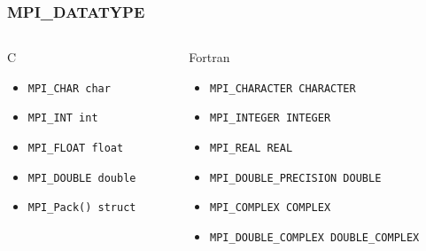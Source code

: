 \documentclass[handout]{beamer}
\begin{document}
\begin{frame}[fragile]
 \frametitle{MPI\_DATATYPE}
  \begin{columns}[T]
   \begin{column}{5cm}
    \begin{block}{C}
     \begin{itemize}
      \item \texttt{MPI\_CHAR char}
      \item \texttt{MPI\_INT int}
      \item \texttt{MPI\_FLOAT float}
      \item \texttt{MPI\_DOUBLE double}
      \item \texttt{MPI\_Pack() struct}
     \end{itemize}
    \end{block}
   \end{column}
   \begin{column}{5cm}
    \begin{block}{Fortran}
     \begin{itemize}
      \item \texttt{MPI\_CHARACTER CHARACTER}
      \item \texttt{MPI\_INTEGER INTEGER}
      \item \texttt{MPI\_REAL REAL}
      \item \texttt{MPI\_DOUBLE\_PRECISION DOUBLE}
      \item \texttt{MPI\_COMPLEX COMPLEX}
      \item \texttt{MPI\_DOUBLE\_COMPLEX DOUBLE\_COMPLEX}
     \end{itemize}
    \end{block}
   \end{column}
  \end{columns}
\end{frame}
\end{document}

